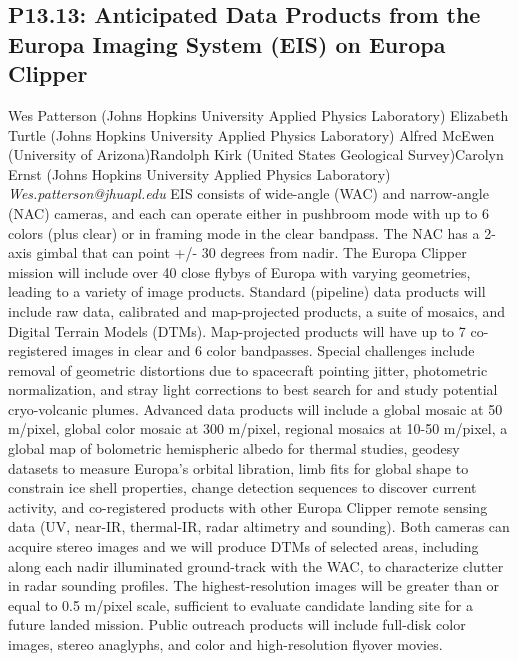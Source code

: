 \documentclass{report}
\begin{document}
\subsection*{P13.13: Anticipated Data Products from the Europa Imaging System (EIS) on Europa Clipper}
\bigskip
Wes Patterson (Johns Hopkins University Applied Physics Laboratory) \newline Elizabeth Turtle (Johns Hopkins University Applied Physics Laboratory) \newline  Alfred McEwen (University of Arizona)\newline  Randolph Kirk (United States Geological Survey)\newline Carolyn Ernst (Johns Hopkins University Applied Physics Laboratory)\newline  \newline\newline
{\it Wes.patterson@jhuapl.edu}\newline
\newline\newline
EIS consists of wide-angle (WAC) and narrow-angle (NAC) cameras, and each can operate either in pushbroom mode with up to 6 colors (plus clear) or in framing mode in the clear bandpass.  The NAC has a 2-axis gimbal that can point +/- 30 degrees from nadir.  The Europa Clipper mission will include over 40 close flybys of Europa with varying geometries, leading to a variety of image products.  Standard (pipeline) data products will include raw data, calibrated and map-projected products, a suite of mosaics, and Digital Terrain Models (DTMs).   Map-projected products will have up to 7 co-registered images in clear and 6 color bandpasses.  Special challenges include removal of geometric distortions due to spacecraft pointing jitter, photometric normalization,  and stray light corrections to best search for and study potential cryo-volcanic plumes.  Advanced data products will include a global mosaic at 50 m/pixel, global color mosaic at 300 m/pixel, regional mosaics at 10-50 m/pixel, a global map of bolometric hemispheric albedo for thermal studies, geodesy datasets to measure Europa’s orbital libration, limb fits for global shape to constrain ice shell properties, change detection sequences to discover current activity, and co-registered products with other Europa Clipper remote sensing data (UV, near-IR, thermal-IR, radar altimetry and sounding).   Both cameras can acquire stereo images and we will produce DTMs of selected areas, including along each nadir illuminated ground-track with the WAC, to characterize clutter in radar sounding profiles.  The highest-resolution images will be greater than or equal to 0.5 m/pixel scale, sufficient to evaluate candidate landing site for a future landed mission.  Public outreach products will include full-disk color images, stereo anaglyphs, and color and high-resolution flyover movies.\newline
\newpage
\end{document}
